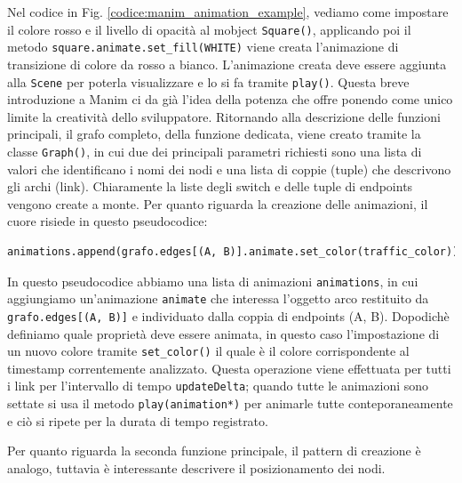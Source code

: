 \documentclass[binding=0.6cm]{sapthesis}
\begin{document}
Nel codice in Fig. \ref{codice:manim_animation_example}, vediamo come impostare il colore rosso e il livello di opacità al mobject \lstinline|Square()|,
applicando poi il metodo \lstinline|square.animate.set_fill(WHITE)| viene creata l'animazione di transizione di colore da rosso a bianco.
L'animazione creata deve essere aggiunta alla \lstinline|Scene| per poterla visualizzare e lo si fa tramite \lstinline|play()|.
Questa breve introduzione a Manim ci da già l'idea della potenza che offre ponendo come unico limite la creatività dello sviluppatore.
Ritornando alla descrizione delle funzioni principali, il grafo completo, della funzione dedicata, viene creato tramite la classe
\lstinline|Graph()|, in cui due dei principali parametri richiesti sono una lista di valori che identificano i nomi dei nodi e una lista di coppie (tuple)
che descrivono gli archi (link). Chiaramente la liste degli switch e delle tuple di endpoints vengono create a monte. Per quanto riguarda
la creazione delle animazioni, il cuore risiede in questo pseudocodice:


{\scriptsize %
\begin{lstlisting}[language=Python, caption={Creazione animazione traffico}, label={codice:traffic_animation_example}]
animations.append(grafo.edges[(A, B)].animate.set_color(traffic_color))
\end{lstlisting}
}
In questo pseudocodice abbiamo una lista di animazioni \lstinline|animations|, in cui aggiungiamo un'animazione \lstinline|animate| che interessa l'oggetto arco 
restituito da \lstinline|grafo.edges[(A, B)]| e individuato dalla coppia di endpoints (A, B). Dopodichè definiamo quale proprietà deve essere animata,
 in questo caso l'impostazione di un nuovo colore tramite \lstinline|set_color()| il quale è il colore corrispondente al timestamp correntemente analizzato.
Questa operazione viene effettuata per tutti i link per l'intervallo di tempo \texttt{updateDelta}; quando tutte le animazioni sono settate si usa
il metodo \lstinline|play(animation*)| per animarle tutte conteporaneamente e ciò si ripete per la durata di tempo registrato.

Per quanto riguarda la seconda funzione principale, il pattern di creazione è analogo, tuttavia è interessante descrivere il posizionamento dei nodi.
\end{document}
